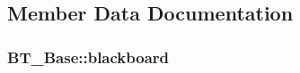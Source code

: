 \subsection{Member Data Documentation}
\subsubsection[{\texorpdfstring{blackboard}{blackboard}}]{ B\+T\+\_\+\+Base\+::blackboard\hspace{0.3cm}{\ttfamily [private]}}\hypertarget{class_b_t___base_a8a095b67df2778f5155d24dad9f818ef}{}\label{class_b_t___base_a8a095b67df2778f5155d24dad9f818ef}
